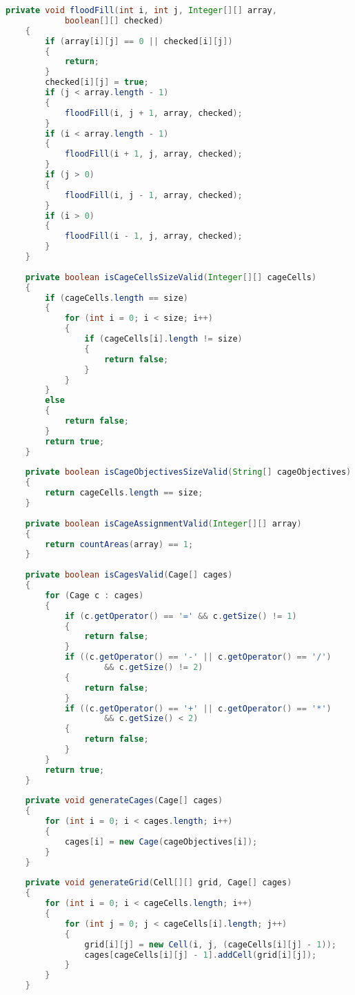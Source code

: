 \begin{lstlisting}[language=Java,basicstyle=\tiny,caption=Grid.java]
    private void floodFill(int i, int j, Integer[][] array, 
            boolean[][] checked)
    {
        if (array[i][j] == 0 || checked[i][j])
        {
            return;
        }
        checked[i][j] = true;
        if (j < array.length - 1)
        {
            floodFill(i, j + 1, array, checked);
        }
        if (i < array.length - 1)
        {
            floodFill(i + 1, j, array, checked);
        }
        if (j > 0)
        {
            floodFill(i, j - 1, array, checked);
        }
        if (i > 0)
        {
            floodFill(i - 1, j, array, checked);
        }
    }
    
    private boolean isCageCellsSizeValid(Integer[][] cageCells)
    {
        if (cageCells.length == size)
        {
            for (int i = 0; i < size; i++)
            {
                if (cageCells[i].length != size)
                {
                    return false;
                }
            }
        }
        else
        {
            return false;
        }
        return true;
    }
    
    private boolean isCageObjectivesSizeValid(String[] cageObjectives)
    {
        return cageCells.length == size;
    }
    
    private boolean isCageAssignmentValid(Integer[][] array)
    {
        return countAreas(array) == 1;
    }
    
    private boolean isCagesValid(Cage[] cages)
    {
        for (Cage c : cages)
        {
            if (c.getOperator() == '=' && c.getSize() != 1)
            {
                return false;
            }
            if ((c.getOperator() == '-' || c.getOperator() == '/') 
                    && c.getSize() != 2)
            {
                return false;
            }
            if ((c.getOperator() == '+' || c.getOperator() == '*') 
                    && c.getSize() < 2)
            {
                return false;
            }
        }
        return true;
    }
    
    private void generateCages(Cage[] cages)
    {
        for (int i = 0; i < cages.length; i++)
        {
            cages[i] = new Cage(cageObjectives[i]);
        }
    }
    
    private void generateGrid(Cell[][] grid, Cage[] cages)
    {
        for (int i = 0; i < cageCells.length; i++)
        {
            for (int j = 0; j < cageCells[i].length; j++)
            {
                grid[i][j] = new Cell(i, j, (cageCells[i][j] - 1));
                cages[cageCells[i][j] - 1].addCell(grid[i][j]);
            }
        }
    }
    

\end{lstlisting}
